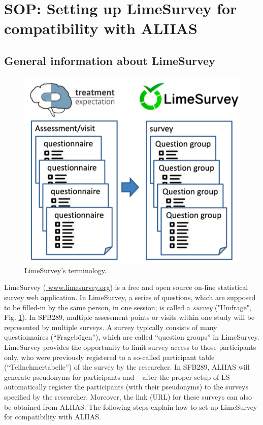 \pagebreak
\section{SOP: Setting up LimeSurvey for compatibility with ALIIAS}
\label{section:ls_setup}

\subsection*{General information about LimeSurvey}

\begin{figure}
\centering
\includegraphics{docs/fig/ls_conventions.png}
\caption{LimeSurvey's terminology.}
\label{fig:ls_conventions}
\end{figure}

LimeSurvey (\href{www.limesurvey.org}{\color{pniblue} www.limesurvey.org}) is a free and open source on-line statistical survey web application.
In LimeSurvey, a series of questions, which are supposed to be filled-in by the same person, in one session; is called a \emph{survey} ("Umfrage", Fig. \ref{fig:ls_conventions}).
In SFB289, multiple assessment points or visits within one study will be represented by multiple surveys.
A survey typically consists of many questionnaires (“Fragebögen”), which are called “question groups” in LimeSurvey.
LimeSurvey provides the opportunity to limit survey access to those participants only, who were previously registered to a so-called participant table (“Teilnehmertabelle”) of the survey by the researcher. In SFB289, ALIIAS will generate pseudonyms for participants and – after the proper setup of LS – automatically register the participants (with their pseudonyms) to the surveys specified by the researcher. Moreover, the link (URL) for these surveys can also be obtained from ALIIAS. The following steps explain how to set up LimeSurvey for compatibility with ALIIAS.

